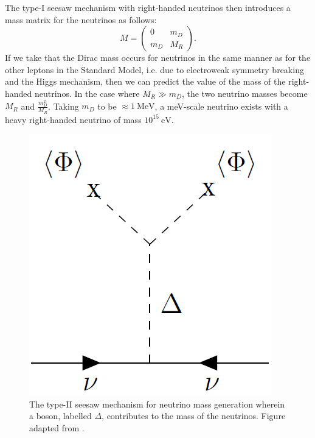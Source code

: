 The type-I seesaw mechanism with right-handed neutrinos then introduces a mass matrix for the neutrinos as follows:
\begin{equation}
M =\begin{pmatrix}
0 & m_D \\
m_D & M_R
\end{pmatrix}.
\end{equation}
If we take that the Dirac mass occurs for neutrinos in the same manner as for the other leptons in the Standard Model, i.e. due to electroweak symmetry breaking and the Higgs mechanism, then we can predict the value of the mass of the right-handed neutrinos.
In the case where $M_R \gg m_D$, the two neutrino masses become $M_R$ and $\frac{m_D^2}{M_R}$.
Taking $m_D$ to be $\approx1~\textrm{MeV}$, a meV-scale neutrino exists with a heavy right-handed neutrino of mass $10^{15}~\textrm{eV}$.

\begin{figure}[tbph]
    \centering
\includegraphics[width=0.40\linewidth]{Figures/TypeIISeesaw.png}
    \caption[Type-II seesaw mechanism]
    {The type-II seesaw mechanism for neutrino mass generation wherein a boson, labelled $\Delta$, contributes to the mass of the neutrinos.
    Figure adapted from \cite{MIRANDA2016436}.}
    \label{fig:TypeIISeesawMechanism}
\end{figure}


